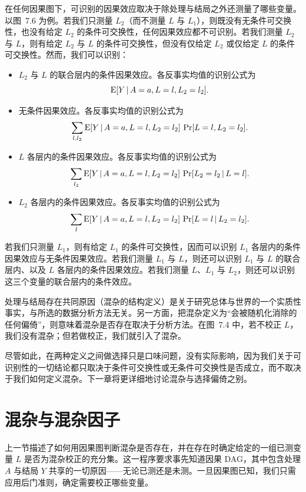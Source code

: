 \begin{finepoint}[条件效应与无条件效应的识别]
在任何因果图下，可识别的因果效应取决于除处理与结局之外还测量了哪些变量。以图~7.6 为例。若我们只测量 $L_2$（而不测量 $L$ 与 $L_1$），则既没有无条件可交换性，也没有给定 $L_2$ 的条件可交换性，任何因果效应都不可识别。若我们测量 $L_2$ 与 $L$，则有给定 $L_2$ 与 $L$ 的条件可交换性，但没有仅给定 $L_2$ 或仅给定 $L$ 的条件可交换性。然而，我们可以识别：

\begin{itemize}
\item $L_2$ 与 $L$ 的联合层内的条件因果效应。各反事实均值的识别公式为
\[
\mathrm{E}[Y\,|\, A=a,L=l,L_2=l_2].
\]
\item 无条件因果效应。各反事实均值的识别公式为
\[
\sum_{l,l_2}\mathrm{E}[Y\,|\, A=a,L=l,L_2=l_2]\,\Pr[L=l,L_2=l_2].
\]
\item $L$ 各层内的条件因果效应。各反事实均值的识别公式为
\[
\sum_{l_2}\mathrm{E}[Y\,|\, A=a,L=l,L_2=l_2]\,\Pr[L_2=l_2\,|\, L=l].
\]
\item $L_2$ 各层内的条件因果效应。各反事实均值的识别公式为
\[
\sum_{l}\mathrm{E}[Y\,|\, A=a,L=l,L_2=l_2]\,\Pr[L=l\,|\, L_2=l_2].
\]
\end{itemize}

若我们只测量 $L_1$，则有给定 $L_1$ 的条件可交换性，因而可以识别 $L_1$ 各层内的条件因果效应与无条件因果效应。若我们测量 $L_1$ 与 $L$，则还可以识别 $L_1$ 与 $L$ 的联合层内、以及 $L$ 各层内的条件因果效应。若我们测量 $L$、$L_1$ 与 $L_2$，则还可以识别这三个变量的联合层内的条件效应。
\end{finepoint}

处理与结局存在共同原因（混杂的结构定义）是关于研究总体与世界的一个实质性事实，与所选的数据分析方法无关。另一方面，把混杂定义为“会被随机化消除的任何偏倚”，则意味着混杂是否存在取决于分析方法。在图~7.4 中，若不校正 $L$，我们没有混杂；但若做校正，我们就引入了混杂。

尽管如此，在两种定义之间做选择只是口味问题，没有实际影响，因为我们关于可识别性的一切结论都只取决于条件可交换性或无条件可交换性是否成立，而不取决于我们如何定义混杂。下一章将更详细地讨论混杂与选择偏倚之别。

\section{混杂与混杂因子}

上一节描述了如何用因果图判断混杂是否存在，并在存在时确定给定的一组已测变量 $L$ 是否为混杂校正的充分集。这一程序要求事先知道因果 DAG，其中包含处理 $A$ 与结局 $Y$ 共享的一切原因——无论已测还是未测。一旦因果图已知，我们只需应用后门准则，确定需要校正哪些变量。

